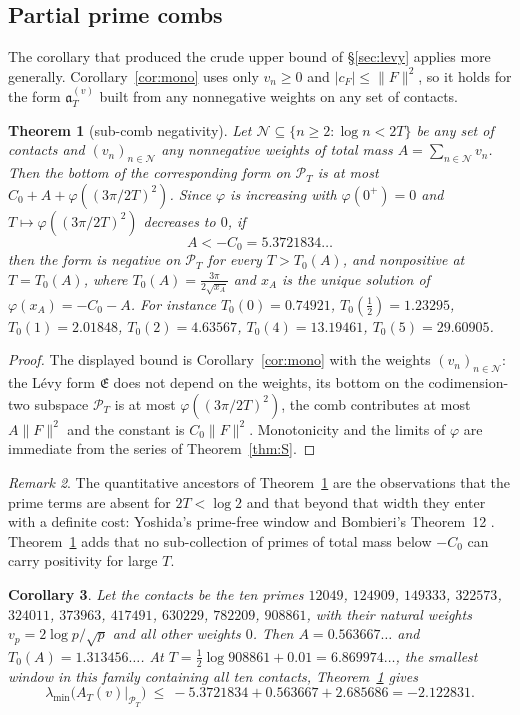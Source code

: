 \documentclass[11pt]{amsart}
\newtheorem{theorem}{Theorem}[section]
\newtheorem{corollary}[theorem]{Corollary}
\theoremstyle{definition}
\theoremstyle{remark}
\newtheorem{remark}[theorem]{Remark}
\newcommand{\PT}{\mathcal P_T}
\newcommand{\cF}{c_F}
\newcommand{\Lev}{\mathfrak E}
\begin{document}
\subsection{Partial prime combs}
The corollary that produced the crude upper bound of \S\ref{sec:levy} applies more generally.
Corollary~\ref{cor:mono} uses only $v_n\ge0$ and $|\cF|\le\|F\|^2$, so it holds for the form
$\mathfrak a^{(v)}_T$ built from any nonnegative weights on any set of contacts.

\begin{theorem}[sub-comb negativity]\label{thm:SC}
Let $\mathcal N\subseteq\{n\ge2:\log n<2T\}$ be any set of contacts and $(v_n)_{n\in\mathcal N}$ any
nonnegative weights of total mass $A=\sum_{n\in\mathcal N}v_n$. Then the bottom of the corresponding
form on $\PT$ is at most $C_0+A+\varphi((3\pi/2T)^2)$. Since $\varphi$ is increasing with
$\varphi(0^+)=0$ and $T\mapsto\varphi((3\pi/2T)^2)$ decreases to $0$, if
\[
A<-C_0=5.3721834\ldots
\]
then the form is negative on $\PT$ for every $T>T_0(A)$, and nonpositive at $T=T_0(A)$, where $T_0(A)=\frac{3\pi}{2\sqrt{x_A}}$ and
$x_A$ is the unique solution of $\varphi(x_A)=-C_0-A$. For instance $T_0(0)=0.74921$,
$T_0(\frac12)=1.23295$, $T_0(1)=2.01848$, $T_0(2)=4.63567$, $T_0(4)=13.19461$, $T_0(5)=29.60905$.
\end{theorem}
\begin{proof}
The displayed bound is Corollary~\ref{cor:mono} with the weights $(v_n)_{n\in\mathcal N}$: the L\'evy
form $\Lev$ does not depend on the weights, its bottom on the codimension-two subspace $\PT$ is at
most $\varphi((3\pi/2T)^2)$, the comb contributes at most $A\|F\|^2$ and the constant is $C_0\|F\|^2$.
Monotonicity and the limits of $\varphi$ are immediate from the series of Theorem~\ref{thm:S}.
\end{proof}
\begin{remark}
The quantitative ancestors of Theorem~\ref{thm:SC} are the observations that the prime terms are
absent for $2T<\log2$ and that beyond that width they enter with a definite cost: Yoshida's prime-free
window \cite{Yoshida1992} and Bombieri's Theorem~12 \cite{Bombieri2000}. Theorem~\ref{thm:SC} adds
that no sub-collection of primes of total mass below $-C_0$ can carry positivity for large $T$.
\end{remark}


\begin{corollary}\label{cor:SC1}
Let the contacts be the ten primes $12049$, $124909$, $149333$, $322573$, $324011$, $373963$,
$417491$, $630229$, $782209$, $908861$, with their natural weights $v_p=2\log p/\sqrt p$ and all other
weights $0$. Then $A=0.563667\ldots$ and $T_0(A)=1.313456\ldots$. At
$T=\frac12\log908861+0.01=6.869974\ldots$, the smallest window in this family containing all ten
contacts, Theorem~\ref{thm:SC} gives
\[
\lambda_{\min}\big(A_T(v)\big|_{\PT}\big)\ \le\ -5.3721834+0.563667+2.685686=-2.122831 .
\]
\end{corollary}
\end{document}
